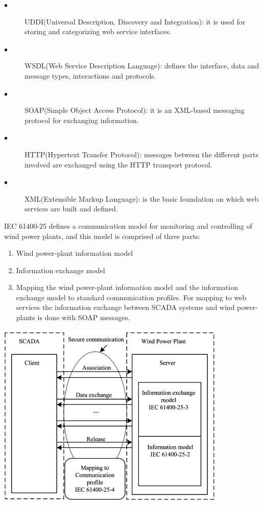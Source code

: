 \documentclass[twosided,a4,10pt]{article}
\begin{document}
\begin{multicols}{2}
   \begin{description}
   	\item[$\bullet$] 
   	UDDI(Universal Description, Discovery and Integration): it is used for storing and categorizing web service interfaces.
   	\item[$\bullet$]
   	WSDL(Web Service Description Language): defines the interface, data and message types, interactions and protocols.
   	\item[$\bullet$]
   	SOAP(Simple Object Access Protocol): it is an XML-based messaging protocol for exchanging information.
   	\item[$\bullet$]
   	HTTP(Hypertext Transfer Protocol): messages between the different parts involved are exchanged using the HTTP transport protocol.
   	\item[$\bullet$]
   	XML(Extensible Markup Language): is the basic foundation on which web services are built and defined.
   \end{description} 
  	IEC 61400-25 defines a communication model for monitoring and controlling of wind power plants, and this model is comprised of three parts:
  	\begin{enumerate}
  		\item Wind power-plant information model
  		\item Information exchange model
  		\item Mapping the wind power-plant information model and the information exchange model to standard communication profiles. For mapping to web services the information exchange between SCADA systems and wind power-plants is done with SOAP messages.
  	\end{enumerate}	
  	\includegraphics[scale=0.65]{IECProtocol.png}

\end{multicols}
\end{document}
